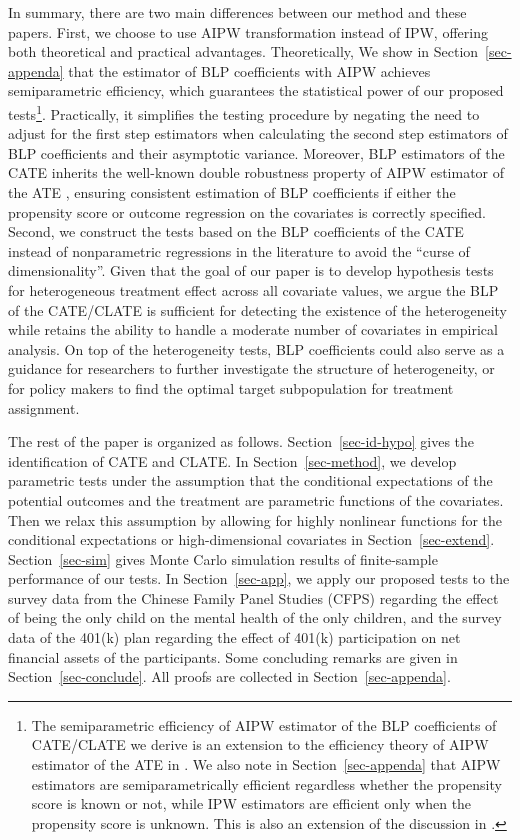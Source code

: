\documentclass[
  12pt,
  12pt]{article}
\numberwithin{equation}{section}
\theoremstyle{definition}
\theoremstyle{plain}
\theoremstyle{plain}
\theoremstyle{remark}
\begin{document}
In summary, there are two main differences between our method and these
papers. First, we choose to use AIPW transformation instead of IPW,
offering both theoretical and practical advantages. Theoretically, We
show in Section~\ref{sec-appenda} that the estimator of BLP coefficients
with AIPW achieves semiparametric efficiency, which guarantees the
statistical power of our proposed tests\footnote{The semiparametric
  efficiency of AIPW estimator of the BLP coefficients of CATE/CLATE we
  derive is an extension to the efficiency theory of AIPW estimator of
  the ATE in \citet{qin2017efficient}. We also note in
  Section~\ref{sec-appenda} that AIPW estimators are semiparametrically
  efficient regardless whether the propensity score is known or not,
  while IPW estimators are efficient only when the propensity score is
  unknown. This is also an extension of the discussion in
  \citet{hirano2003efficient}.}. Practically, it simplifies the testing
procedure by negating the need to adjust for the first step estimators
when calculating the second step estimators of BLP coefficients and
their asymptotic variance. Moreover, BLP estimators of the CATE inherits
the well-known double robustness property of AIPW estimator of the ATE
\citep[e.g.][]{robins1994estimation, scharfstein1999adjusting, lunceford2004stratification, kang2007demystifying},
ensuring consistent estimation of BLP coefficients if either the
propensity score or outcome regression on the covariates is correctly
specified. Second, we construct the tests based on the BLP coefficients
of the CATE instead of nonparametric regressions in the literature to
avoid the ``curse of dimensionality''. Given that the goal of our paper
is to develop hypothesis tests for heterogeneous treatment effect across
all covariate values, we argue the BLP of the CATE/CLATE is sufficient
for detecting the existence of the heterogeneity while retains the
ability to handle a moderate number of covariates in empirical analysis.
On top of the heterogeneity tests, BLP coefficients could also serve as
a guidance for researchers to further investigate the structure of
heterogeneity, or for policy makers to find the optimal target
subpopulation for treatment assignment.

The rest of the paper is organized as follows. Section~\ref{sec-id-hypo}
gives the identification of CATE and CLATE. In Section~\ref{sec-method},
we develop parametric tests under the assumption that the conditional
expectations of the potential outcomes and the treatment are parametric
functions of the covariates. Then we relax this assumption by allowing
for highly nonlinear functions for the conditional expectations or
high-dimensional covariates in Section~\ref{sec-extend}.
Section~\ref{sec-sim} gives Monte Carlo simulation results of
finite-sample performance of our tests. In Section~\ref{sec-app}, we
apply our proposed tests to the survey data from the Chinese Family
Panel Studies (CFPS) regarding the effect of being the only child on the
mental health of the only children, and the survey data of the 401(k)
plan regarding the effect of 401(k) participation on net financial
assets of the participants. Some concluding remarks are given in
Section~\ref{sec-conclude}. All proofs are collected in
Section~\ref{sec-appenda}.
\end{document}
